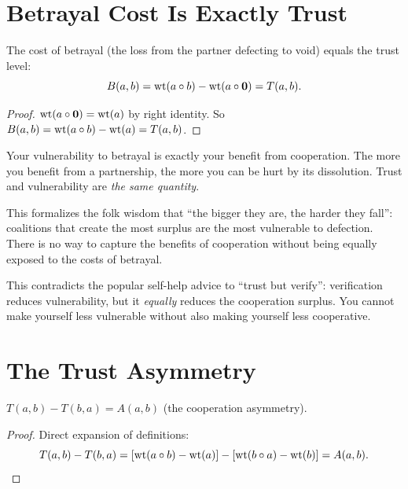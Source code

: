 \section{Betrayal Cost Is Exactly Trust}

\begin{theorem}
\label{thm:betrayal-cost}
The cost of betrayal (the loss from the partner defecting to void) equals the trust level:
\[
B(a,b) = \operatorname{wt}(a \circ b) - \operatorname{wt}(a \circ \mathbf{0}) = T(a,b).
\]
\end{theorem}

\begin{proof}
$\operatorname{wt}(a \circ \mathbf{0}) = \operatorname{wt}(a)$ by right identity. So $B(a,b) = \operatorname{wt}(a \circ b) - \operatorname{wt}(a) = T(a,b)$.
\end{proof}

\begin{paradox}
Your vulnerability to betrayal is exactly your benefit from cooperation. The more you benefit from a partnership, the more you can be hurt by its dissolution. Trust and vulnerability are \emph{the same quantity}.

This formalizes the folk wisdom that ``the bigger they are, the harder they fall'': coalitions that create the most surplus are the most vulnerable to defection. There is no way to capture the benefits of cooperation without being equally exposed to the costs of betrayal.

This contradicts the popular self-help advice to ``trust but verify'': verification reduces vulnerability, but it \emph{equally} reduces the cooperation surplus. You cannot make yourself less vulnerable without also making yourself less cooperative.
\end{paradox}

\section{The Trust Asymmetry}

\begin{theorem}
\label{thm:trust-asymmetry}
$T(a,b) - T(b,a) = A(a,b)$ (the cooperation asymmetry).
\end{theorem}

\begin{proof}
Direct expansion of definitions:
\[
T(a,b) - T(b,a) = [\operatorname{wt}(a \circ b) - \operatorname{wt}(a)] - [\operatorname{wt}(b \circ a) - \operatorname{wt}(b)] = A(a,b).
\]
\end{proof}

